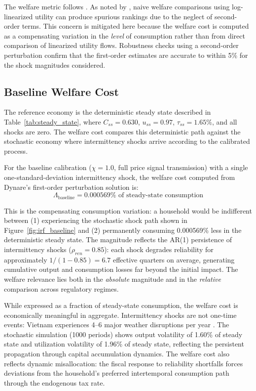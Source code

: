 \documentclass[12pt, a4paper]{article}
\begin{document}
The welfare metric follows \citet{lucas1987}. As noted by \citet{kim2003}, naive welfare comparisons using log-linearized utility can produce spurious rankings due to the neglect of second-order terms. This concern is mitigated here because the welfare cost is computed as a compensating variation in the \textit{level} of consumption rather than from direct comparison of linearized utility flows. Robustness checks using a second-order perturbation confirm that the first-order estimates are accurate to within 5\% for the shock magnitudes considered.

\subsection{Baseline Welfare Cost}

The reference economy is the deterministic steady state described in Table~\ref{tab:steady_state}, where $C_{ss} = 0.630$, $u_{ss} = 0.97$, $\tau_{ss} = 1.65\%$, and all shocks are zero. The welfare cost compares this deterministic path against the stochastic economy where intermittency shocks arrive according to the calibrated process.

For the baseline calibration ($\chi = 1.0$, full price signal transmission) with a single one-standard-deviation intermittency shock, the welfare cost computed from Dynare's first-order perturbation solution is:
\begin{equation*}
\Lambda_{\text{baseline}} = 0.000569\% \text{ of steady-state consumption}
\end{equation*}

\noindent This is the compensating consumption variation: a household would be indifferent between (1) experiencing the stochastic shock path shown in Figure~\ref{fig:irf_baseline} and (2) permanently consuming 0.000569\% less in the deterministic steady state. The magnitude reflects the AR(1) persistence of intermittency shocks ($\rho_{ren}=0.85$): each shock degrades reliability for approximately $1/(1-0.85)=6.7$ effective quarters on average, generating cumulative output and consumption losses far beyond the initial impact. The welfare relevance lies both in the \textit{absolute} magnitude and in the \textit{relative} comparison across regulatory regimes.

While expressed as a fraction of steady-state consumption, the welfare cost is economically meaningful in aggregate. Intermittency shocks are not one-time events: Vietnam experiences 4--6 major weather disruptions per year \citep{nguyenle2019}. The stochastic simulation (1000 periods) shows output volatility of 1.60\% of steady state and utilization volatility of 1.96\% of steady state, reflecting the persistent propagation through capital accumulation dynamics. The welfare cost also reflects dynamic misallocation: the fiscal response to reliability shortfalls forces deviations from the household's preferred intertemporal consumption path through the endogenous tax rate.
\end{document}
